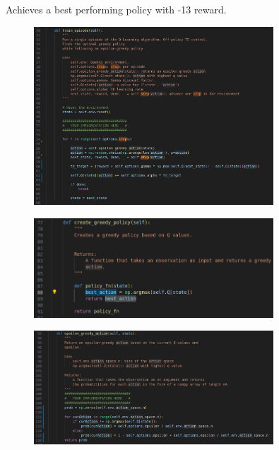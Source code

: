 \documentclass[a4paper]{article}
\theoremstyle{definition}
\newenvironment{soln}{
    \leavevmode\color{blue}\ignorespaces
}{}
\begin{document}
Achieves a best performing policy with -13 reward.

\begin{soln}
    \begin{figure}[H]
        \centering
        \includegraphics[width=0.8\textwidth]{images/3.train_episode.png}
    \end{figure}
    \begin{figure}[H]
        \centering
        \includegraphics[width=0.8\textwidth]{images/3.create_greedy_policy.png}
    \end{figure}
    \begin{figure}[H]
        \centering
        \includegraphics[width=0.8\textwidth]{images/3.epsilon.png}
    \end{figure}



\end{soln}
\end{document}
